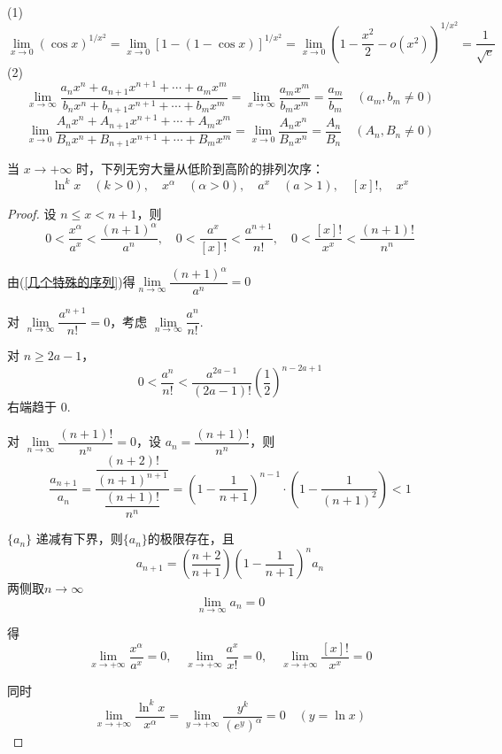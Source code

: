 \begin{example}
	(1)\[	\lim_{x \to 0} (\cos x)^{1/x^2} = \lim_{x \to 0} \left[1 - (1 - \cos x)\right]^{1/x^2} = \lim_{x \to 0} \left(1 - \frac{x^2}{2}-o(x^2)\right)^{1/x^2} = \dfrac{1}{\sqrt{e}}\]
	(2)\[	\lim_{x \to \infty} \frac{a_n x^n + a_{n+1} x^{n+1} + \cdots + a_m x^m}{b_n x^n + b_{n+1} x^{n+1} + \cdots + b_m x^m} = \lim_{x \to \infty} \frac{a_m x^m}{b_m x^m} = \frac{a_m}{b_m} \quad (a_m, b_m \neq 0)\]
	\[	\lim_{x \to 0} \frac{A_n x^n + A_{n+1} x^{n+1} + \cdots + A_m x^m}{B_n x^n + B_{n+1} x^{n+1} + \cdots + B_m x^m} = \lim_{x \to 0} \frac{A_n x^n}{B_n x^n} = \frac{A_n}{B_n} \quad (A_n, B_n \neq 0)	\]
\end{example}
\begin{example}\label{阶的比较}
	当 \( x \to +\infty \) 时，下列无穷大量从低阶到高阶的排列次序：
	\[ \ln^k x \quad (k > 0), \quad x^\alpha \quad (\alpha > 0), \quad a^x \quad (a > 1), \quad [x]!, \quad x^x \]
	
	
\end{example}
\begin{proof}
	设 \( n \leqslant x < n+1 \)，则
	\[ 0 < \frac{x^\alpha}{a^x} < \frac{(n+1)^\alpha}{a^n}, \quad 0 < \frac{a^x}{[x]!} < \frac{a^{n+1}}{n!}, \quad 0 < \frac{[x]!}{x^x} < \frac{(n+1)!}{n^n} \]
	
	由(\ref{几个特殊的序列})得\(\lim\limits_{n \to \infty} \dfrac{(n+1)^\alpha}{a^n} = 0\)
	
	对 \(\lim\limits_{n \to \infty} \dfrac{a^{n+1}}{n!} = 0\)，考虑 \(\lim\limits_{n \to \infty} \dfrac{a^n}{n!}\).
	
	对 \(n \ge 2a - 1\)，
	\[ 0 < \frac{a^n}{n!} < \frac{a^{2a-1}}{(2a-1)!} \left(\frac{1}{2}\right)^{n-2a+1} \]
	右端趋于 0.
	
	对 \(\lim\limits_{n \to \infty} \dfrac{(n+1)!}{n^n} = 0\)，设 \(a_n = \dfrac{(n+1)!}{n^n}\)，则
	\[
	\dfrac{a_{n+1}}{a_n} = \dfrac{\dfrac{(n+2)!}{(n+1)^{n+1}}}{\dfrac{(n+1)!}{n^n}} = \left(1 - \frac{1}{n+1}\right)^{n-1} \cdot \left(1 - \frac{1}{(n+1)^2}\right)<1
	\]
	
	
	\(\{a_n\}\) 递减有下界，则$\{a_n\}$的极限存在，且
	\[a_{n+1}=(\frac{n+2}{n+1})(1-\frac{1}{n+1})^na_n\]
	两侧取$n\to\infty$
	\[
	\lim_{n \to \infty} a_n = 0
	\]
	
	得
	\[
	\lim_{x \to +\infty} \frac{x^\alpha}{a^x} = 0, \quad \lim_{x \to +\infty} \frac{a^x}{x!} = 0, \quad \lim_{x \to +\infty} \frac{[x]!}{x^x} = 0
	\]
	
	同时
	\[
	\lim_{x \to +\infty} \frac{\ln^k x}{x^\alpha} = \lim_{y \to +\infty} \frac{y^k}{(e^y)^\alpha} = 0 \quad (y = \ln x)\]
\end{proof}
